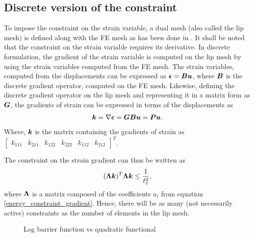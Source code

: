 \documentclass[11pt]{elsarticle}
\begin{document}
\subsection{Discrete version of the constraint}
To impose the constraint on the strain variable, a dual mesh (also called the lip mesh) is defined along with the FE mesh as has been done in \cite{Moes and Chevaugeon}. It shall be noted that the constraint on the strain variable requires its derivative. In discrete formulation, the gradient of the strain variable is computed on the lip mesh by using the strain variables computed from the FE mesh. The strain variables, computed from the displacements can be expressed as $\mbox{\boldmath $\epsilon$} = \mbox{\boldmath $B$} \mbox{\boldmath $u$}$, where $\mbox{\boldmath $B$}$ is the discrete gradient operator, computed on the FE mesh. Likewise, defining the discrete gradient operator on the lip mesh and representing it in a matrix form as $\mbox{\boldmath $G$}$, the gradients of strain can be expressed in terms of the displacements as 
\begin{equation}
	\mbox{\boldmath $k$} = \nabla \mbox{\boldmath $\epsilon$} = \mbox{\boldmath $G$} \mbox{\boldmath $B$} \mbox{\boldmath $u$} = \mbox{\boldmath $P$} \mbox{\boldmath $u$}.
\end{equation}
Where, $\mbox{\boldmath $k$}$ is the matrix containing the gradients of strain as $\begin{bmatrix}
	k_{111} & k_{211} & k_{122} & k_{222} & k_{112} & k_{212}
\end{bmatrix}^T$.

The constraint on the strain gradient can thus be written as 
\begin{equation} \label{discrete_constraint}
	(\mbox{\boldmath $\Lambda$} \mbox{\boldmath $k$} )^T \mbox{\boldmath $\Lambda$} \mbox{\boldmath $k$} \leq \frac{1}{\ell_c^2},
\end{equation}
where $\mbox{\boldmath $\Lambda$}$ is a matrix composed of the coefficients $a_i$ from equation \ref{energy_constraint_gradient}. Hence, there will be as many (not necessarily active) constraints as the number of elements in the lip mesh.

\begin{figure}[ht]
	\centering
	
	\caption{Log barrier function vs quadratic functional}
	\label{comparison_log_quadratic}
\end{figure}
\end{document}

